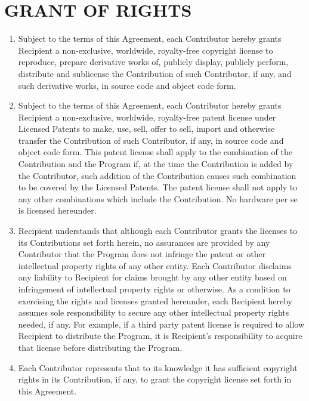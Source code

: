 \section{GRANT OF RIGHTS}

\begin{enumerate}%
\item
Subject to the terms of this Agreement, each Contributor hereby grants  Recipient a non-exclusive, worldwide, royalty-free copyright license to  reproduce, prepare derivative works of, publicly display, publicly perform,  distribute and sublicense the Contribution of such Contributor, if any, and such derivative works, in source code and object code form.


\item
Subject to the terms of this Agreement, each Contributor hereby grants  Recipient a non-exclusive, worldwide, royalty-free patent license under  Licensed Patents to make, use, sell, offer to sell, import and otherwise  transfer the Contribution of such Contributor, if any, in source code and  object code form. This patent license shall apply to the combination of the Contribution and the Program if, at the time the Contribution is added by the  Contributor, such addition of the Contribution causes such combination to be  covered by the Licensed Patents. The patent license shall not apply to any  other combinations which include the Contribution. No hardware per se is  licensed hereunder.


\item
Recipient understands that although each Contributor grants the licenses  to its Contributions set forth herein, no assurances are provided by any  Contributor that the Program does not infringe the patent or other intellectual  property rights of any other entity. Each Contributor disclaims any liability  to Recipient for claims brought by any other entity based on infringement of  intellectual property rights or otherwise. As a condition to exercising the  rights and licenses granted hereunder, each Recipient hereby assumes sole responsibility to secure any other intellectual property rights needed, if any.  For example, if a third party patent license is required to allow Recipient to  distribute the Program, it is Recipient's responsibility to acquire that  license before distributing the Program.


\item
Each Contributor represents that to its knowledge it has sufficient  copyright rights in its Contribution, if any, to grant the copyright license  set forth in this Agreement.
\end{enumerate}

